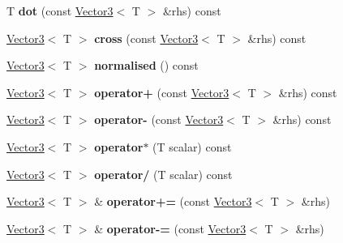 \begin{DoxyCompactItemize}
T {\bfseries dot} (const \mbox{\hyperlink{class_vector3}{Vector3}}$<$ T $>$ \&rhs) const
\item 
\mbox{\label{class_vector3_a55d165924a9c4c4fb29aba342259450f}} 
\mbox{\hyperlink{class_vector3}{Vector3}}$<$ T $>$ {\bfseries cross} (const \mbox{\hyperlink{class_vector3}{Vector3}}$<$ T $>$ \&rhs) const
\item 
\mbox{\label{class_vector3_a527c54e392f3aa4b942df2eb7aa3b38b}} 
\mbox{\hyperlink{class_vector3}{Vector3}}$<$ T $>$ {\bfseries normalised} () const
\item 
\mbox{\label{class_vector3_ae773f6324d5ee80b042632297e573400}} 
\mbox{\hyperlink{class_vector3}{Vector3}}$<$ T $>$ {\bfseries operator+} (const \mbox{\hyperlink{class_vector3}{Vector3}}$<$ T $>$ \&rhs) const
\item 
\mbox{\label{class_vector3_a385caaf9d5ce60bc720b8304d9c98937}} 
\mbox{\hyperlink{class_vector3}{Vector3}}$<$ T $>$ {\bfseries operator-\/} (const \mbox{\hyperlink{class_vector3}{Vector3}}$<$ T $>$ \&rhs) const
\item 
\mbox{\label{class_vector3_af1a6bd4542b3cb1d78fb90b81f9b3763}} 
\mbox{\hyperlink{class_vector3}{Vector3}}$<$ T $>$ {\bfseries operator$\ast$} (T scalar) const
\item 
\mbox{\label{class_vector3_a50099461c7eeb5471b022918de5c86c3}} 
\mbox{\hyperlink{class_vector3}{Vector3}}$<$ T $>$ {\bfseries operator/} (T scalar) const
\item 
\mbox{\label{class_vector3_a46410fa08aa469fe979bc29601ee18f0}} 
\mbox{\hyperlink{class_vector3}{Vector3}}$<$ T $>$ \& {\bfseries operator+=} (const \mbox{\hyperlink{class_vector3}{Vector3}}$<$ T $>$ \&rhs)
\item 
\mbox{\label{class_vector3_a57ae63fe916c0042a46545780b23c05e}} 
\mbox{\hyperlink{class_vector3}{Vector3}}$<$ T $>$ \& {\bfseries operator-\/=} (const \mbox{\hyperlink{class_vector3}{Vector3}}$<$ T $>$ \&rhs)
\item 
\mbox{\label{class_vector3_af44f1cfdedf62a46e803d838ed6640ad}} 

\end{DoxyCompactItemize}
